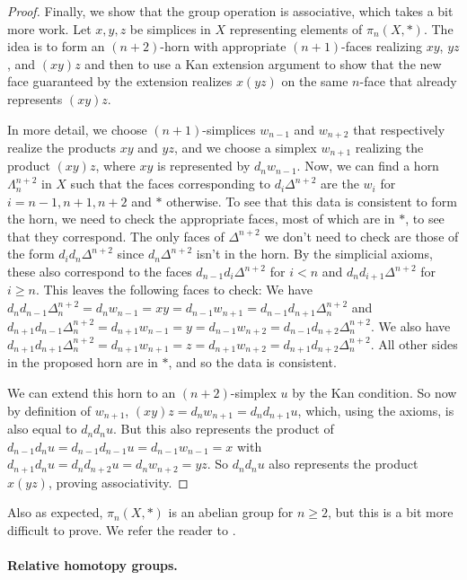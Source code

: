 \documentclass[12pt]{article}
\theoremstyle{plain}
\theoremstyle{definition}
\theoremstyle{remark}
\begin{document}
\begin{proof}
Finally, we show that the group operation is associative, which takes a bit more work. 
Let $x,y,z$ be simplices in $X$ representing elements of $\pi_n(X,*)$. The idea is to form an $(n+2)$-horn with appropriate $(n+1)$-faces realizing $xy$, $yz$, and $(xy)z$ and then to use a Kan extension argument to show that the new face guaranteed by the extension realizes $x(yz)$ on the same $n$-face that already represents $(xy)z$.

In more detail, we choose $(n+1)$-simplices $w_{n-1}$ and $w_{n+2}$ that respectively realize the products $xy$ and $yz$, and we choose a simplex $w_{n+1}$ realizing the product $(xy)z$, where $xy$ is represented by $d_nw_{n-1}$. Now, we can find a horn $\Lambda^{n+2}_n$ in $X$ such that the faces corresponding to $d_i\Delta^{n+2}$ are the $w_i$ for $i=n-1,n+1,n+2$ and $*$ otherwise. To see that this data is consistent to form the horn, we  need to check  the appropriate faces, most of which are in $*$, to see that they correspond.  The only faces of $\Delta^{n+2}$ we don't need to check are those of the form $d_id_n\Delta^{n+2}$ since $d_n\Delta^{n+2}$ isn't in the horn. By the simplicial axioms, these also correspond to the faces  $d_{n-1}d_i\Delta^{n+2}$ for  $i<n$ and $d_nd_{i+1}\Delta^{n+2}$ for $i\geq n$. This leaves the following faces to check: We have $d_nd_{n-1}\Delta^{n+2}_n=d_nw_{n-1}=xy=d_{n-1}w_{n+1}=d_{n-1}d_{n+1}\Delta^{n+2}_n$ and $d_{n+1}d_{n-1}\Delta^{n+2}_n=d_{n+1}w_{n-1}=y=d_{n-1}w_{n+2}=d_{n-1}d_{n+2}\Delta^{n+2}_n$.  We also have  $d_{n+1}d_{n+1}\Delta^{n+2}_n=d_{n+1}w_{n+1}=z=d_{n+1}w_{n+2}=d_{n+1}d_{n+2}\Delta^{n+2}_n$.  All other sides in the proposed horn are in $*$, and so the data is consistent.

We can extend this horn to an $(n+2)$-simplex $u$ by the Kan condition. So now by definition of $w_{n+1}$,  $(xy)z=d_nw_{n+1}=d_nd_{n+1}u$, which, using the axioms, is also equal to $d_nd_nu$. But this also represents the product of $d_{n-1}d_nu=d_{n-1}d_{n-1}u=d_{n-1}w_{n-1}=x$ with $d_{n+1}d_nu=d_nd_{n+2}u=d_nw_{n+2}=yz$. So $d_nd_nu$ also represents the product $x(yz)$, proving associativity. 
\end{proof}


Also as expected, $\pi_n(X,*)$ is an abelian group for  $n\geq 2$, but this is a bit more difficult to prove. We refer the reader to \cite[Proposition 4.4]{MAY67}. 




\paragraph{Relative homotopy groups.}
\end{document}
